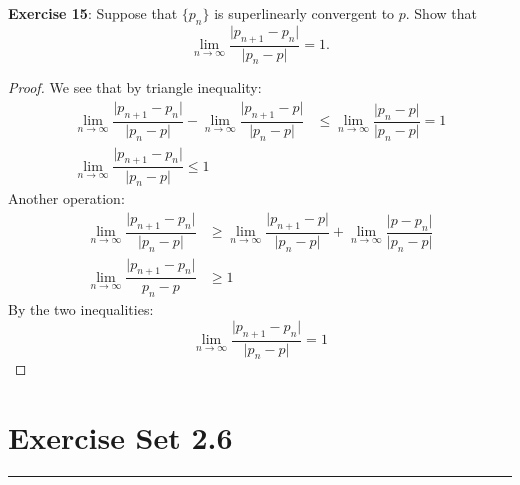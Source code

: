 \documentclass{article}
\begin{document}
\textbf{Exercise 15}: Suppose that $\{p_{n}\}$ is superlinearly convergent to $p$. Show that  
    \begin{equation*}
        \lim\limits_{n \to \infty} \dfrac{\lvert p_{n + 1} - p_{n} \rvert}{\lvert p_{n} - p \rvert} = 1.
    \end{equation*}
        \begin{proof}
            We see that by triangle inequality:
                \begin{align*}
                    \lim\limits_{n \to \infty} \dfrac{\lvert p_{n + 1} - p_{n} \rvert}{\lvert p_{n} - p \rvert} - \lim\limits_{n \to \infty} \dfrac{\lvert p_{n + 1} - p \rvert}{\lvert p_{n} - p \rvert} &\leq \lim\limits_{n \to \infty} \dfrac{\lvert p_{n} - p \rvert}{\lvert p_{n} - p \rvert} = 1 \\
                    \lim\limits_{n \to \infty} \dfrac{\lvert p_{n + 1} - p_{n} \rvert}{\lvert p_{n} - p \rvert} \leq 1
                \end{align*}
            Another operation:
                \begin{align*}
                    \lim\limits_{n \to \infty} \dfrac{\lvert p_{n + 1} - p_{n} \rvert}{\lvert p_{n} - p \rvert} &\geq \lim\limits_{n \to \infty} \dfrac{\lvert p_{n + 1} - p \rvert}{\lvert p_{n} - p \rvert} + \lim\limits_{n \to \infty} \dfrac{\lvert p - p_{n} \rvert}{\lvert p_{n} - p \rvert} \\
                    \lim\limits_{n \to \infty} \dfrac{\lvert p_{n + 1} - p_{n} \rvert}{p_{n} - p}               &\geq 1                                                                                                                                                                               
                \end{align*}
            By the two inequalities:
                \begin{equation*}
                    \lim\limits_{n \to \infty} \dfrac{\lvert p_{n + 1} - p_{n} \rvert}{\lvert p_{n} - p \rvert} = 1
                \end{equation*}
        \end{proof}

\newpage
\section*{Exercise Set 2.6}
\hrule
\end{document}
